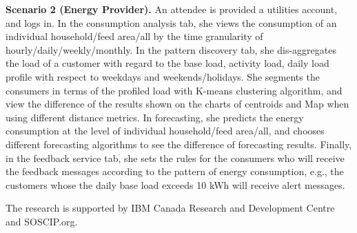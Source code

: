 \documentclass{sig-alternate}
\newcommand{\eg}{e.g.}
\begin{document}
{\bf Scenario 2 (Energy Provider).}
An attendee is provided a utilities account, and logs in. In the consumption analysis tab, she views the consumption of an individual household/feed area/all by the time granularity of hourly/daily/weekly/monthly. In the pattern discovery tab, she dis-aggreg\-ates the load of a customer with regard to the base load, activity load, daily load profile with respect to weekdays and weekends/holidays. She segments the consumers in terms of the profiled load with K-means clustering algorithm, and view the difference of the results shown on the charts of centroids and Map when using different distance metrics.  In forecasting, she predicts the energy consumption at the level of individual household/feed area/all, and chooses different forecasting algorithms to see the difference of forecasting results. Finally, in the feedback service tab, she  sets the rules for the consumers who will receive the feedback messages according to the pattern of energy consumption, \eg, the customers whose the daily base load exceeds 10 kWh will receive alert messages.
 
 The research is supported by IBM Canada Research and Development Centre and SOSCIP.org. 




\end{document}
